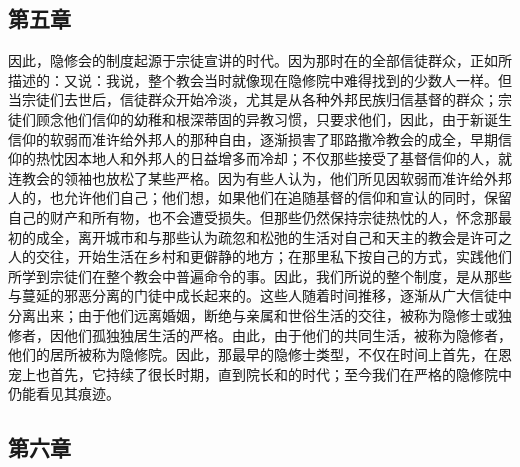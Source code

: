 \subsection{第五章}

\par

因此，隐修会的制度起源于宗徒宣讲的时代。因为那时在的全部信徒群众，正如所描述的：又说：我说，整个教会当时就像现在隐修院中难得找到的少数人一样。但当宗徒们去世后，信徒群众开始冷淡，尤其是从各种外邦民族归信基督的群众；宗徒们顾念他们信仰的幼稚和根深蒂固的异教习惯，只要求他们，因此，由于新诞生信仰的软弱而准许给外邦人的那种自由，逐渐损害了耶路撒冷教会的成全，早期信仰的热忱因本地人和外邦人的日益增多而冷却；不仅那些接受了基督信仰的人，就连教会的领袖也放松了某些严格。因为有些人认为，他们所见因软弱而准许给外邦人的，也允许他们自己；他们想，如果他们在追随基督的信仰和宣认的同时，保留自己的财产和所有物，也不会遭受损失。但那些仍然保持宗徒热忱的人，怀念那最初的成全，离开城市和与那些认为疏忽和松弛的生活对自己和天主的教会是许可之人的交往，开始生活在乡村和更僻静的地方；在那里私下按自己的方式，实践他们所学到宗徒们在整个教会中普遍命令的事。因此，我们所说的整个制度，是从那些与蔓延的邪恶分离的门徒中成长起来的。这些人随着时间推移，逐渐从广大信徒中分离出来；由于他们远离婚姻，断绝与亲属和世俗生活的交往，被称为隐修士或独修者，因他们孤独独居生活的严格。由此，由于他们的共同生活，被称为隐修者，他们的居所被称为隐修院。因此，那最早的隐修士类型，不仅在时间上首先，在恩宠上也首先，它持续了很长时期，直到院长和的时代；至今我们在严格的隐修院中仍能看见其痕迹。\par


\subsection{第六章}

\par

